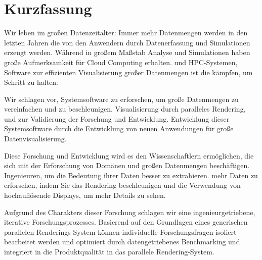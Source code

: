 

\chapter*{Kurzfassung}
Wir leben im großen Datenzeitalter: Immer mehr Datenmengen werden in den letzten Jahren
die von den Anwendern durch Datenerfassung und Simulationen erzeugt werden. Während in großem Maßstab
Analyse und Simulationen haben große Aufmerksamkeit für Cloud Computing erhalten.
und HPC-Systemen, Software zur effizienten Visualisierung großer Datenmengen ist
die kämpfen, um Schritt zu halten.

Wir schlagen vor, Systemsoftware zu erforschen, um große Datenmengen zu vereinfachen und zu beschleunigen.
Visualisierung durch paralleles Rendering, und zur Validierung der Forschung und Entwicklung.
Entwicklung dieser Systemsoftware durch die Entwicklung von neuen Anwendungen für
große Datenvisualisierung.

Diese Forschung und Entwicklung wird es den Wissenschaftlern ermöglichen, die sich mit der Erforschung von Domänen und großen Datenmengen beschäftigen.
Ingenieuren, um die Bedeutung ihrer Daten besser zu extrahieren.
mehr Daten zu erforschen, indem Sie das Rendering beschleunigen und die Verwendung von
hochauflösende Displays, um mehr Details zu sehen.

Aufgrund des Charakters dieser Forschung schlagen wir eine ingenieurgetriebene, iterative
Forschungsprozesses. Basierend auf den Grundlagen eines generischen parallelen Renderings
System können individuelle Forschungsfragen isoliert bearbeitet werden und
optimiert durch datengetriebenes Benchmarking und integriert in die Produktqualität
in das parallele Rendering-System.
